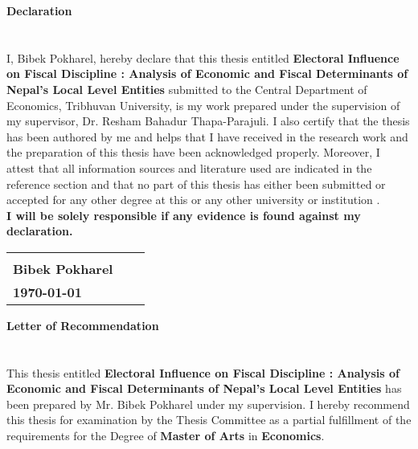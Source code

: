 \begin{center}
\textbf{\large Declaration}
\end{center}
\section*{}


\vspace{-10mm}I, Bibek Pokharel, hereby declare that this thesis entitled \textbf{Electoral Influence on Fiscal Discipline : Analysis of  Economic and Fiscal Determinants of Nepal's Local Level Entities} submitted to the Central Department of Economics, Tribhuvan University, is my work prepared under the supervision of my supervisor, Dr. Resham Bahadur Thapa-Parajuli. I also certify that the thesis has been authored by me and helps that I have received in the research work and the preparation of this thesis have been acknowledged properly. Moreover, I attest that all information sources and literature used are indicated in the reference section and that no part of this thesis has either been submitted or accepted for any other degree at this or any other university or institution .\vspace{10mm}\\ 
\textbf{I will be solely responsible if any evidence is found against my declaration.} \\

\vspace{25mm}
\noindent
\begin{tabular}{@{}p{2.5in}p{2in}p{2in}@{}}
\hrulefill \\
\textbf{Bibek Pokharel} &&\\
\textbf{\today}\\
\end{tabular}

\setcounter{page}{2}


\newpage
\begin{center}
\textbf{\large Letter of Recommendation}
\end{center}\section*{}


\vspace{-10mm}This thesis entitled \textbf{Electoral Influence on Fiscal Discipline : Analysis of  Economic and Fiscal Determinants of Nepal's Local Level Entities} has been prepared by Mr. Bibek Pokharel under my supervision. I hereby recommend this thesis for examination by the Thesis Committee as a partial fulfillment of the requirements for the Degree of \textbf{Master of Arts} in \textbf{Economics}.\vspace{15mm} \\

